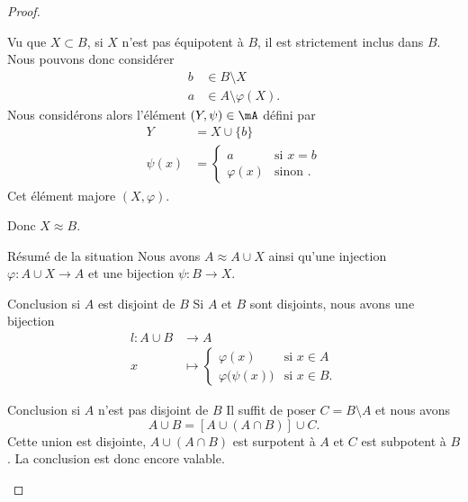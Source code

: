 \begin{proof}
\begin{subproof}
            Vu que \( X\subset B\), si \( X\) n'est pas équipotent à \( B\), il est strictement inclus dans \( B\). Nous pouvons donc considérer
            \begin{subequations}
                \begin{align}
                    b&\in B\setminus X\\
                    a&\in A\setminus \varphi(X).
                \end{align}
            \end{subequations}
            Nous considérons alors l'élément \( (Y,\psi)\in \mA\) défini par
            \begin{subequations}
                \begin{align}
                    Y&=X\cup\{ b \}\\
                    \psi(x)&=\begin{cases}
                        a    &   \text{si } x=b\\
                        \varphi(x)    &    \text{sinon }.
                    \end{cases}
                \end{align}
            \end{subequations}
            Cet élément majore \( (X,\varphi)\).

            Donc \( X\approx B\).
        \item[Résumé de la situation]
            Nous avons \( A\approx A\cup X\) ainsi qu'une injection \( \varphi\colon A\cup X\to A\) et une bijection \( \psi\colon B\to X\).
        \item[Conclusion si \( A\) est disjoint de \( B\)]
            Si \( A\) et \( B\) sont disjoints, nous avons une bijection
            \begin{equation}
                \begin{aligned}
                    l\colon A\cup B&\to A \\
                    x&\mapsto \begin{cases}
                        \varphi(x)    &   \text{si }  x\in A\\
                        \varphi\big( \psi(x) \big)    &    \text{si } x\in B.
                    \end{cases}
                \end{aligned}
            \end{equation}
        \item[Conclusion si \( A\) n'est pas disjoint de \( B\)]
            Il suffit de poser \( C=B\setminus A\) et nous avons
            \begin{equation}
                A\cup B=[A\cup (A\cap B)]\cup C.
            \end{equation}
            Cette union est disjointe, \( A\cup(A\cap B)\) est surpotent à \( A\) et \( C\) est subpotent à $B$. La conclusion est donc encore valable.
    \end{subproof}
\end{proof}

